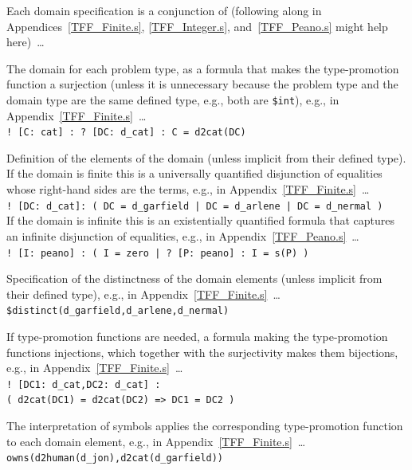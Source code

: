 \documentclass{easychair}
\newcommand{\smalltt}[1]{\small \texttt{#1}}
\newenvironment{packed_itemize}{
\vspace*{-0.3em}
\begin{itemize}
\setlength{\partopsep}{0pt}
\setlength{\itemsep}{1pt}
\setlength{\parskip}{0pt}
\setlength{\parsep}{0pt}
}{\end{itemize}}
\begin{document}
Each domain specification is a conjunction of (following along in Appendices~\ref{TFF_Finite.s}, 
\ref{TFF_Integer.s}, and~\ref{TFF_Peano.s} might help here)~\ldots
\begin{packed_itemize}
\item The domain for each problem type, as a formula that makes the type-promotion function a 
      surjection (unless it is unnecessary because the problem type and the domain type are the
      same defined type, e.g., both are {\tt \$int}), e.g., in Appendix~\ref{TFF_Finite.s}~\ldots\\
      \hspace*{0.5cm}\smalltt{! [C: cat] : ? [DC: d\_cat] : C = d2cat(DC)}
\item Definition of the elements of the domain (unless implicit from their defined type).
      If the domain is finite this is a universally quantified disjunction of equalities whose 
      right-hand sides are the terms, e.g., in Appendix~\ref{TFF_Finite.s}~\ldots\\
      \hspace*{0.5cm}\smalltt{! [DC: d\_cat]: ( DC = d\_garfield | DC = d\_arlene | DC = d\_nermal )}\\
      If the domain is infinite this is an existentially quantified formula that captures an 
      infinite disjunction of equalities, e.g., in Appendix~\ref{TFF_Peano.s}~\ldots\\
      \hspace*{0.5cm}\smalltt{! [I: peano] : ( I = zero | ? [P: peano] : I = s(P) )}
\item Specification of the distinctness of the domain elements (unless implicit from their
      defined type), e.g., in Appendix~\ref{TFF_Finite.s}~\ldots\\
      \hspace*{0.5cm}\smalltt{\$distinct(d\_garfield,d\_arlene,d\_nermal)}
\item If type-promotion functions are needed, a formula making the type-promotion functions 
      injections,
      which together with the surjectivity makes them bijections, e.g., in 
      Appendix~\ref{TFF_Finite.s}~\ldots\\
      \hspace*{0.5cm}\smalltt{! [DC1: d\_cat,DC2: d\_cat] :}\\
      \hspace*{1.0cm}\smalltt{( d2cat(DC1) = d2cat(DC2) => DC1 = DC2 )}
\end{packed_itemize}
\vspace*{-0.5em}
The interpretation of symbols applies the corresponding type-promotion function to each domain
element, e.g., in Appendix~\ref{TFF_Finite.s}~\ldots\\
\hspace*{0.5cm}\smalltt{owns(d2human(d\_jon),d2cat(d\_garfield))}
\end{document}
